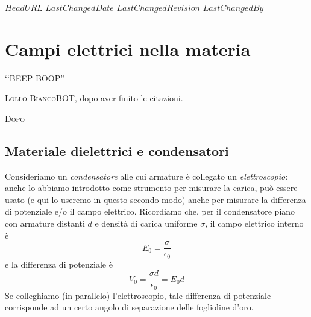 \svnidlong
{$HeadURL$}
{$LastChangedDate$}
{$LastChangedRevision$}
{$LastChangedBy$}

\chapter{Campi elettrici nella materia}

\begin{introduction}
	‘‘BEEP BOOP''
	\begin{flushright}
		\textsc{Lollo BiancoBOT}, dopo aver finito le citazioni. %
	\end{flushright}
\end{introduction}
\lettrine[findent=1pt, nindent=0pt]{D}{opo}
\section{Materiale dielettrici e condensatori}
Consideriamo un \textit{condensatore} alle cui armature è collegato un \textit{elettroscopio}: anche lo abbiamo introdotto come strumento per misurare la carica, può essere usato (e qui lo useremo in questo secondo modo) anche per misurare la differenza di potenziale e/o il campo elettrico. Ricordiamo che, per il condensatore piano con armature distanti $d$ e densità di carica uniforme $\sigma$, il campo elettrico interno è
\begin{equation*}
	E_0=\frac{\sigma}{\epsilon_0}
\end{equation*}
e la differenza di potenziale è
\begin{equation*}
	V_0=\frac{\sigma d}{\epsilon_0}=E_0d
\end{equation*}
Se colleghiamo (in parallelo) l'elettroscopio, tale differenza di potenziale corrisponde ad un certo angolo di separazione delle foglioline d'oro. 
